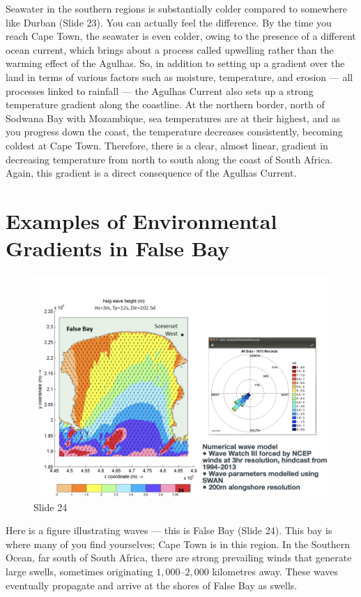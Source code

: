 \documentclass[
  10pt,
]{book}
\begin{document}
Seawater in the southern regions is substantially colder compared to
somewhere like Durban (Slide 23). You can actually feel the difference.
By the time you reach Cape Town, the seawater is even colder, owing to
the presence of a different ocean current, which brings about a process
called upwelling rather than the warming effect of the Agulhas. So, in
addition to setting up a gradient over the land in terms of various
factors such as moisture, temperature, and erosion --- all processes
linked to rainfall --- the Agulhas Current also sets up a strong
temperature gradient along the coastline. At the northern border, north
of Sodwana Bay with Mozambique, sea temperatures are at their highest,
and as you progress down the coast, the temperature decreases
consistently, becoming coldest at Cape Town. Therefore, there is a
clear, almost linear, gradient in decreasing temperature from north to
south along the coast of South Africa. Again, this gradient is a direct
consequence of the Agulhas Current.

\section{Examples of Environmental Gradients in False
Bay}\label{examples-of-environmental-gradients-in-false-bay}

\begin{figure}[ht]
\centering
\includegraphics[width=0.8\linewidth]{../images/BDC334/BDC334-024.jpeg}
\caption*{Slide 24}
\end{figure}

Here is a figure illustrating waves --- this is False Bay (Slide 24).
This bay is where many of you find yourselves; Cape Town is in this
region. In the Southern Ocean, far south of South Africa, there are
strong prevailing winds that generate large swells, sometimes
originating \(1{,}000\)--\(2{,}000\) kilometres away. These waves
eventually propagate and arrive at the shores of False Bay as swells.
\end{document}
